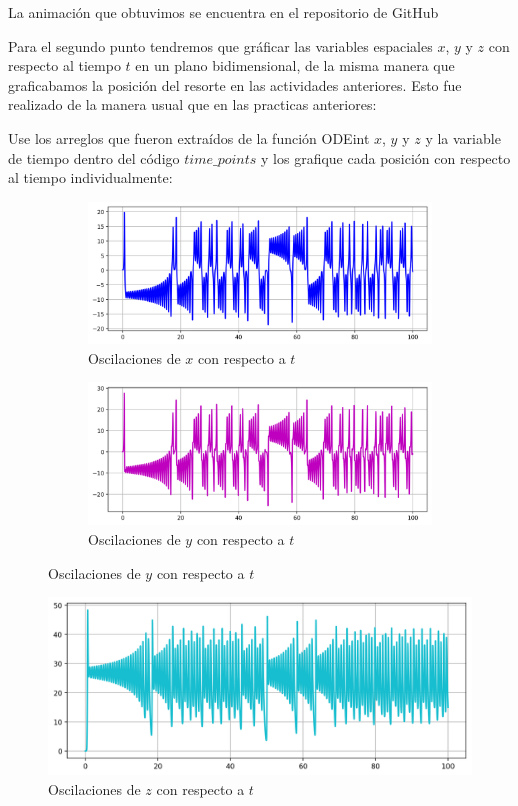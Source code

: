\documentclass{article}
\begin{document}
La animación que obtuvimos se encuentra en el repositorio de GitHub

Para el segundo punto tendremos que gráficar las variables espaciales $x$, $y$ y $z$ con respecto al tiempo $t$ en un plano bidimensional, de la misma manera que graficabamos la posición del resorte en las actividades anteriores. Esto fue realizado de la manera usual que en las practicas anteriores:

Use los arreglos que fueron extraídos de la función ODEint $x$, $y$ y $z$ y la variable de tiempo dentro del código $time\_points$ y los grafique cada posición con respecto al tiempo individualmente:
\begin{figure}[ht!]
	\begin{subfigure}[b]{0.5\linewidth}
    \raggedleft
	\includegraphics[width=\linewidth]{ox-t.png}
    \caption{Oscilaciones de $x$ con respecto a $t$}
	\end{subfigure}
	\begin{subfigure}[b]{0.5\linewidth}
    \raggedright
	\includegraphics[width=\linewidth]{oy-t.png}
	\caption{Oscilaciones de $y$ con respecto a $t$}
    \end{subfigure}
\end{figure}
\begin{figure}[ht!]
\centering
\includegraphics[width=\linewidth]{oz-t.png}
\caption{Oscilaciones de $z$ con respecto a $t$}
\end{figure}
\end{document}
